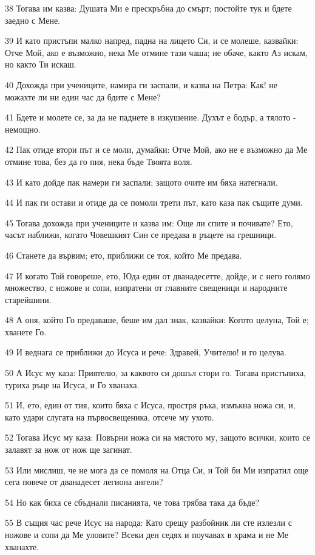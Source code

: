 \par 38 Тогава им казва: Душата Ми е прескръбна до смърт; постойте тук и бдете заедно с Мене.
\par 39 И като пристъпи малко напред, падна на лицето Си, и се молеше, казвайки: Отче Мой, ако е възможно, нека Ме отмине тази чаша; не обаче, както Аз искам, но както Ти искаш.
\par 40 Дохожда при учениците, намира ги заспали, и казва на Петра: Как! не можахте ли ни един час да бдите с Мене?
\par 41 Бдете и молете се, за да не паднете в изкушение. Духът е бодър, а тялото - немощно.
\par 42 Пак отиде втори път и се моли, думайки: Отче Мой, ако не е възможно да Ме отмине това, без да го пия, нека бъде Твоята воля.
\par 43 И като дойде пак намери ги заспали; защото очите им бяха натегнали.
\par 44 И пак ги остави и отиде да се помоли трети път, като каза пак същите думи.
\par 45 Тогава дохожда при учениците и казва им: Още ли спите и почивате? Ето, часът наближи, когато Човешкият Син се предава в ръцете на грешници.
\par 46 Станете да вървим; ето, приближи се тоя, който Ме предава.
\par 47 И когато Той говореше, ето, Юда един от дванадесетте, дойде, и с него голямо множество, с ножове и сопи, изпратени от главните свещеници и народните старейшини.
\par 48 А оня, който Го предаваше, беше им дал знак, казвайки: Когото целуна, Той е; хванете Го.
\par 49 И веднага се приближи до Исуса и рече: Здравей, Учителю! и го целува.
\par 50 А Исус му каза: Приятелю, за каквото си дошъл стори го. Тогава пристъпиха, туриха ръце на Исуса, и Го хванаха.
\par 51 И, ето, един от тия, които бяха с Исуса, простря ръка, измъкна ножа си, и, като удари слугата на първосвещеника, отсече му ухото.
\par 52 Тогава Исус му каза: Повърни ножа си на мястото му, защото всички, които се залавят за нож от нож ще загинат.
\par 53 Или мислиш, че не мога да се помоля на Отца Си, и Той би Ми изпратил още сега повече от дванадесет легиона ангели?
\par 54 Но как биха се сбъднали писанията, че това трябва така да бъде?
\par 55 В същия час рече Исус на народа: Като срещу разбойник ли сте излезли с ножове и сопи да Ме уловите? Всеки ден седях и поучавах в храма и не Ме хванахте.
